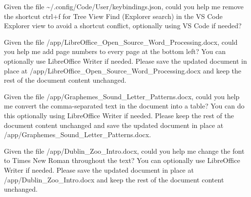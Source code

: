 \documentclass{llmxive}
\begin{document}
\begin{instructionbox}
Given the file \textasciigrave{}\textasciitilde{}/.config/Code/User/keybindings.json\textasciigrave{}, could you help me remove the shortcut \textasciigrave{}ctrl+f\textasciigrave{} for Tree View Find (Explorer search) in the VS Code Explorer view to avoid a shortcut conflict, optionally using VS Code if needed?
\end{instructionbox}

\begin{instructionbox}
Given the file \textasciigrave{}/app/LibreOffice\_Open\_Source\_Word\_Processing.docx\textasciigrave{}, could you help me add page numbers to every page at the bottom left? You can optionally use LibreOffice Writer if needed. Please save the updated document in place at \textasciigrave{}/app/LibreOffice\_Open\_Source\_Word\_Processing.docx\textasciigrave{} and keep the rest of the document content unchanged.
\end{instructionbox}

\begin{instructionbox}
Given the file \textasciigrave{}/app/Graphemes\_Sound\_Letter\_Patterns.docx\textasciigrave{}, could you help me convert the comma-separated text in the document into a table? You can do this optionally using LibreOffice Writer if needed. Please keep the rest of the document content unchanged and save the updated document in place at \textasciigrave{}/app/Graphemes\_Sound\_Letter\_Patterns.docx\textasciigrave{}.
\end{instructionbox}

\begin{instructionbox}
Given the file \textasciigrave{}/app/Dublin\_Zoo\_Intro.docx\textasciigrave{}, could you help me change the font to \textasciigrave{}Times New Roman\textasciigrave{} throughout the text? You can optionally use LibreOffice Writer if needed. Please save the updated document in place at \textasciigrave{}/app/Dublin\_Zoo\_Intro.docx\textasciigrave{} and keep the rest of the document content unchanged.
\end{instructionbox}
\end{document}
